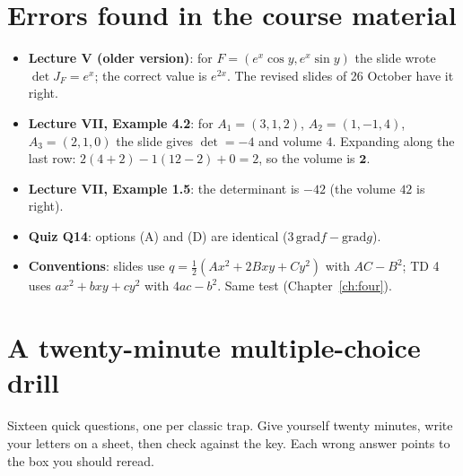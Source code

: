 \section{Errors found in the course material}

\begin{examnote}
\begin{itemize}
  \item \textbf{Lecture V (older version)}: for $F=(e^x\cos y,e^x\sin y)$ the slide wrote $\det J_F=e^x$;
  the correct value is $e^{2x}$. The revised slides of 26 October have it right.
  \item \textbf{Lecture VII, Example 4.2}: for $A_1=(3,1,2)$, $A_2=(1,-1,4)$, $A_3=(2,1,0)$ the slide gives
  $\det=-4$ and volume $4$. Expanding along the last row: $2(4+2)-1(12-2)+0=2$, so the volume is
  $\mathbf 2$.
  \item \textbf{Lecture VII, Example 1.5}: the determinant is $-42$ (the volume $42$ is right).
  \item \textbf{Quiz Q14}: options (A) and (D) are identical ($3\,\mathrm{grad}f-\mathrm{grad}g$).
  \item \textbf{Conventions}: slides use $q=\tfrac12(Ax^2+2Bxy+Cy^2)$ with $AC-B^2$; TD 4 uses
  $ax^2+bxy+cy^2$ with $4ac-b^2$. Same test (Chapter~\ref{ch:four}).
\end{itemize}
\end{examnote}

\section{A twenty-minute multiple-choice drill}

Sixteen quick questions, one per classic trap. Give yourself twenty minutes, write your letters on
a sheet, then check against the key. Each wrong answer points to the box you should reread.

